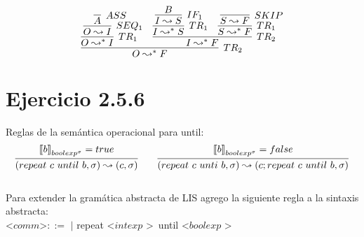 \documentclass[a4paper,12pt]{article}
\begin{document}
$$
\vcenter{
\infer[TR_{2}]{O \leadsto^{*} F}{
    \infer[TR_{1}]{O\leadsto^{*}I}{
        \infer[SEQ_{1}]{O \leadsto I}{ 
            \infer[ASS]{A}{}
        }
    }
    &
    \infer[TR_{2}]{I \leadsto^{*} F}{
        \infer[TR_{1}]{I \leadsto^{*} S}{
            \infer[IF_{1}]{I \leadsto S}{B}
        }
        & 
        \infer[TR_{1}]{S \leadsto^{*} F}{
            \infer[SKIP]{S \leadsto F} {}
        }
    }
}
}
$$

\section{Ejercicio 2.5.6}

Reglas de la semántica operacional para until: \\

$$
\vcenter{
\infer{(repeat \ c \ until \ b,\sigma) \leadsto (c,\sigma)}{|[b|]_{boolexp^{\sigma}} = true}
}{}
\qquad
\vcenter{
\infer{(repeat\ c\ unti \ b,\sigma) \leadsto (c;repeat\ c\ until\ b,\sigma)}{|[b|]_{boolexp^{\sigma}} = false}{}
}
$$
\\
Para extender la gramática abstracta de LIS agrego la siguiente regla a la sintaxis abstracta:\\

\textless $comm$\textgreater $::=$ \quad $|$ repeat \textless $intexp$ \textgreater\ until \textless $boolexp$ \textgreater \\

\newpage




\end{document}
